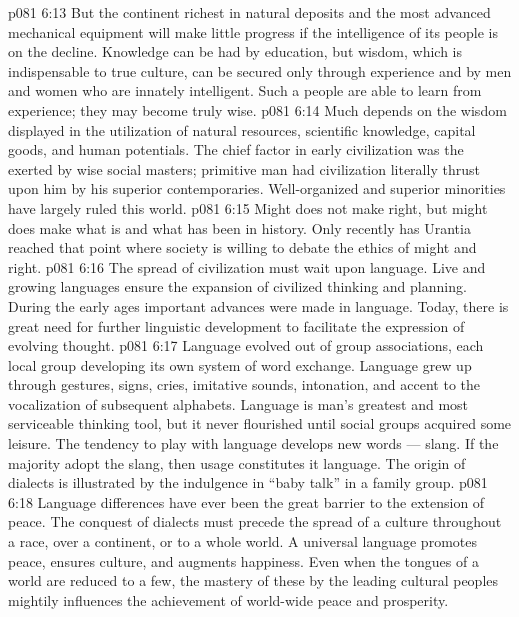 \vs p081 6:13 But the continent richest in natural deposits and the most advanced mechanical equipment will make little progress if the intelligence of its people is on the decline. Knowledge can be had by education, but wisdom, which is indispensable to true culture, can be secured only through experience and by men and women who are innately intelligent. Such a people are able to learn from experience; they may become truly wise.
\vs p081 6:14 \bibnobreakspace {} Much depends on the wisdom displayed in the utilization of natural resources, scientific knowledge, capital goods, and human potentials. The chief factor in early civilization was the  exerted by wise social masters; primitive man had civilization literally thrust upon him by his superior contemporaries. Well\hyp{}organized and superior minorities have largely ruled this world.
\vs p081 6:15 Might does not make right, but might does make what is and what has been in history. Only recently has Urantia reached that point where society is willing to debate the ethics of might and right.
\vs p081 6:16 \bibnobreakspace {} The spread of civilization must wait upon language. Live and growing languages ensure the expansion of civilized thinking and planning. During the early ages important advances were made in language. Today, there is great need for further linguistic development to facilitate the expression of evolving thought.
\vs p081 6:17 Language evolved out of group associations, each local group developing its own system of word exchange. Language grew up through gestures, signs, cries, imitative sounds, intonation, and accent to the vocalization of subsequent alphabets. Language is man’s greatest and most serviceable thinking tool, but it never flourished until social groups acquired some leisure. The tendency to play with language develops new words --- slang. If the majority adopt the slang, then usage constitutes it language. The origin of dialects is illustrated by the indulgence in “baby talk” in a family group.
\vs p081 6:18 Language differences have ever been the great barrier to the extension of peace. The conquest of dialects must precede the spread of a culture throughout a race, over a continent, or to a whole world. A universal language promotes peace, ensures culture, and augments happiness. Even when the tongues of a world are reduced to a few, the mastery of these by the leading cultural peoples mightily influences the achievement of world\hyp{}wide peace and prosperity.
